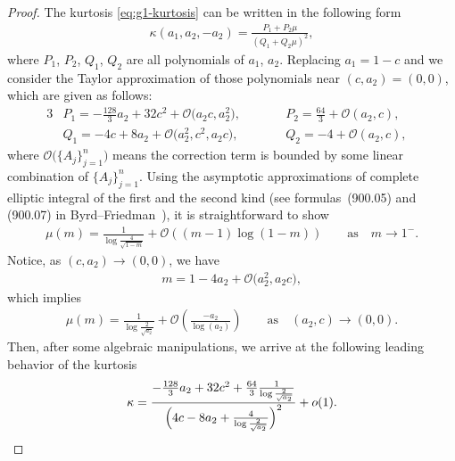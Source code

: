 \documentclass[10pt,a4paper]{amsart}
\numberwithin{equation}{section}
\def\ra{\rightarrow}
\newcommand{\bigo}{\mathcal{O}}
\begin{document}
\begin{proof}The kurtosis \eqref{eq:g1-kurtosis} can be written in the following form
\begin{align*}
\kappa(a_1,a_2,-a_2)=\frac{P_1+P_2\mu}{(Q_1+Q_2\mu)^2},
\end{align*}
where $P_1$, $P_2$, $Q_1$, $Q_2$ are all polynomials of $a_1$, $a_2$. Replacing $a_1=1-c$ and we consider the Taylor approximation of those polynomials near $(c,a_2)=(0,0)$, which are given as follows:
\begin{alignat*}{3}
&P_1=-\frac{128}{3}a_2+32c^2+\bigo\bigl(a_2c,a_2^2\bigr),\qquad && P_2=\frac{64}{3}+\bigo(a_2,c),&\\
&Q_1=-4c+8a_2+\bigo\bigl(a_2^2, c^2, a_2c\bigr),\qquad && Q_2=-4+\bigo(a_2,c),&
\end{alignat*}
where $\bigo\bigl(\{A_j\}_{j=1}^n\bigr)$ means the correction term is bounded by some linear combination of $\{A_j\}_{j=1}^n$. Using the asymptotic approximations of complete elliptic integral of the first and the second kind (see formulas~(900.05) and (900.07) in Byrd--Friedman~\cite{BFbook}), it is straightforward to show
\begin{align*}
\mu(m)=\frac{1}{\log\frac{4}{\sqrt{1-m}}}+\bigo((m-1)\log(1-m))\qquad \text{as} \quad m\ra 1^-.
\end{align*}
Notice, as $(c,a_2)\ra (0,0)$, we have
\begin{align*}
m=1-4a_2+\bigo\bigl(a_2^2,a_2c\bigr),
\end{align*}
which implies
\begin{align*}
\mu(m)=\frac{1}{\log\frac{2}{\sqrt{a_2}}}+\bigo\left(\frac{-a_2}{\log(a_2)}\right) \qquad \text{as}\quad (a_2,c)\ra (0,0).
\end{align*}
Then, after some algebraic manipulations, we arrive at the following leading behavior of the kurtosis
\begin{align*}
\kappa = \frac{-\frac{128}{3}a_2+32c^2+\frac{64}{3}\frac{1}{\log\frac{2}{\sqrt{a_2}}}}{\Bigl(4c-8a_2+\frac{4}{\log\frac{2}{\sqrt{a_2}}}\Bigr)^2}+o(1).
\end{align*}


\end{proof}
\end{document}
